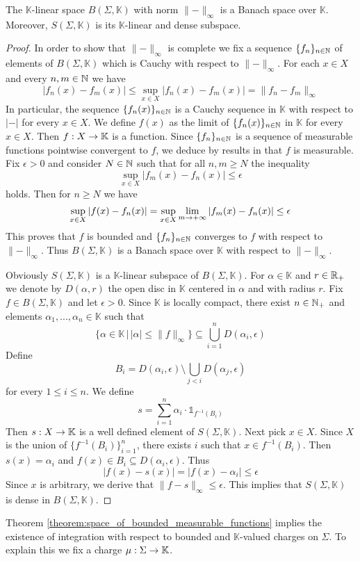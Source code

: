\begin{theorem}\label{theorem:space_of_bounded_measurable_functions}
    The $\mathbb{K}$-linear space $B(\Sigma,\mathbb{K})$ with norm $\lVert-\rVert_{\infty}$ is a Banach space over $\mathbb{K}$. Moreover, $S(\Sigma,\mathbb{K})$ is its $\mathbb{K}$-linear and dense subspace.
\end{theorem}
\begin{proof}
    In order to show that $\lVert-\rVert_{\infty}$ is complete we fix a sequence $\{f_n\}_{n\in {\mathbb N}}$ of elements of $B(\Sigma,\mathbb{K})$ which is Cauchy with respect to $\lVert-\rVert_{\infty}$. For each $x \in X$ and every $n,m\in {\mathbb N}$ we have
    $$|f_n(x) - f_m(x)|\leq \sup_{x\in X}|f_n(x) - f_m(x)| = \lVert f_n - f_m \rVert_{\infty}$$
    In particular, the sequence $\{f_n(x)\}_{n\in {\mathbb N}}$ is a Cauchy sequence in $\mathbb{K}$ with respect to $|-|$ for every $x \in X$. We define $f(x)$ as the limit of $\{f_n(x)\}_{n\in {\mathbb N}}$ in $\mathbb{K}$ for every $x \in X$. Then $f:X\rightarrow \mathbb{K}$ is a function. Since $\{f_n\}_{n\in {\mathbb N}}$ is a sequence of measurable functions pointwise convergent to $f$, we deduce by results in \cite{Integration} that $f$ is measurable. Fix $\epsilon > 0$ and consider $N \in {\mathbb N}$ such that for all $n,m\geq N$ the inequality
    $$\sup_{x\in X}|f_m(x) - f_n(x)|\leq \epsilon$$
    holds. Then for $n \geq N$ we have
    $$\sup_{x\in X}|f(x) - f_n(x)| = \sup_{x\in X}\lim_{m\rightarrow +\infty}|f_m(x) - f_n(x)| \leq \epsilon$$
    This proves that $f$ is bounded and $\{f_n\}_{n\in {\mathbb N}}$ converges to $f$ with respect to $\lVert -\rVert_{\infty}$. Thus $B(\Sigma,\mathbb{K})$ is a Banach space over $\mathbb{K}$ with respect to $\lVert-\rVert_{\infty}$.

    Obviously $S(\Sigma,\mathbb{K})$ is a $\mathbb{K}$-linear subspace of $B(\Sigma,\mathbb{K})$. For $\alpha \in \mathbb{K}$ and $r \in {\mathbb R}_+$ we denote by $D(\alpha,r)$ the open disc in $\mathbb{K}$ centered in $\alpha$ and with radius $r$. Fix $f \in B(\Sigma,\mathbb{K})$ and let $\epsilon > 0$. Since $\mathbb{K}$ is locally compact, there exist $n\in {\mathbb N}_+$ and elements $\alpha_1,...,\alpha_n \in \mathbb{K}$ such that
    $$\big\{\alpha \in \mathbb{K}\,\big|\,|\alpha| \leq \lVert f\rVert_{\infty}\big\}\subseteq \bigcup_{i=1}^nD(\alpha_i,\epsilon)$$
    Define
    $$B_i = D(\alpha_i,\epsilon)\setminus \bigcup_{j < i}D(\alpha_j,\epsilon)$$
    for every $1\leq i \leq n$. We define
    $$s = \sum_{i=1}^n\alpha_i\cdot \mathbb{1}_{f^{-1}(B_i)}$$
    Then $s:X\rightarrow \mathbb{K}$ is a well defined element of $S(\Sigma,\mathbb{K})$. Next pick $x \in X$. Since $X$ is the union of $\{f^{-1}(B_i)\}_{i=1}^n$,
    there exists $i$ such that $x \in f^{-1}(B_i)$. Then $s(x) = \alpha_i$ and $f(x) \in B_i\subseteq D(\alpha_i,\epsilon)$. Thus
    $$|f(x) - s(x)| = |f(x) - \alpha_i|\leq \epsilon$$
    Since $x$ is arbitrary, we derive that $\lVert f - s\rVert_{\infty} \leq \epsilon$. This implies that $S(\Sigma,\mathbb{K})$ is dense in $B(\Sigma,\mathbb{K})$.
\end{proof}
\noindent
Theorem \ref{theorem:space_of_bounded_measurable_functions} implies the existence of integration with respect to bounded and $\mathbb{K}$-valued charges on $\Sigma$. To explain this we fix a charge $\mu:\Sigma \rightarrow \mathbb{K}$.

